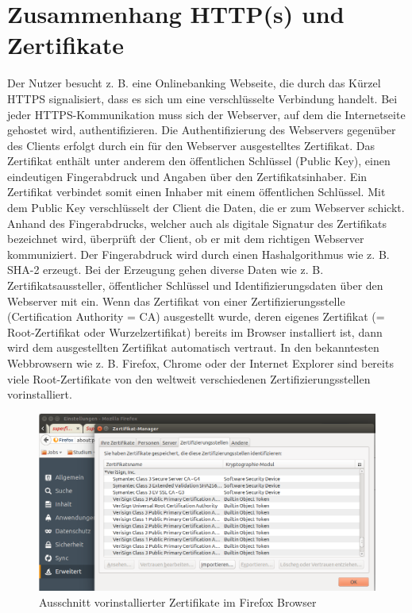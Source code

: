 \section{Zusammenhang HTTP(s) und Zertifikate}
\label{sec:HTTPs}
Der Nutzer besucht z. B. eine Onlinebanking Webseite, die durch das Kürzel HTTPS signalisiert, dass es sich um eine verschlüsselte Verbindung handelt. Bei jeder HTTPS-Kommunikation muss sich der Webserver, auf dem die Internetseite gehostet wird, authentifizieren. Die Authentifizierung des Webservers gegenüber des Clients erfolgt durch ein für den Webserver ausgestelltes Zertifikat. 
Das Zertifikat enthält unter anderem den öffentlichen Schlüssel (Public Key), einen eindeutigen Fingerabdruck und Angaben über den Zertifikatsinhaber. Ein Zertifikat verbindet somit einen Inhaber mit einem öffentlichen Schlüssel. Mit dem Public Key verschlüsselt der Client die Daten, die er zum Webserver schickt. Anhand des Fingerabdrucks, welcher auch als digitale Signatur des Zertifikats bezeichnet wird, überprüft der Client, ob er mit dem richtigen Webserver kommuniziert. Der Fingerabdruck wird durch einen Hashalgorithmus wie z. B. SHA-2 erzeugt. Bei der Erzeugung gehen diverse Daten wie z. B. Zertifikatsaussteller, öffentlicher Schlüssel und Identifizierungsdaten über den Webserver mit ein. 
Wenn das Zertifikat von einer Zertifizierungsstelle (Certification Authority = CA) ausgestellt wurde, deren eigenes Zertifikat (= Root-Zertifikat oder Wurzelzertifikat) bereits im Browser installiert ist, dann wird dem ausgestellten Zertifikat automatisch vertraut. In den bekanntesten Webbrowsern wie z. B. Firefox, Chrome oder der Internet Explorer sind bereits viele Root-Zertifikate von den weltweit verschiedenen Zertifizierungsstellen vorinstalliert.
\begin{figure}[H]
		\centering
		\includegraphics[width=1\linewidth]{images/firefox_installierte_zertifikate.png}
		\caption{Ausschnitt vorinstallierter Zertifikate im Firefox Browser}
\end{figure}
